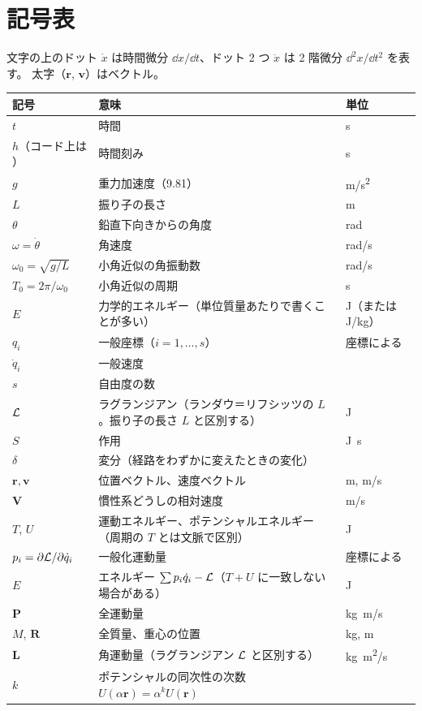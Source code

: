 \chapter{記号表}\label{ch:symbols}

文字の上のドット $\dot x$ は時間微分 $\dd x/\dd t$、ドット 2 つ $\ddot x$ は 2 階微分 $\dd^2x/\dd t^2$ を表す。
太字（$\bm r$, $\bm v$）はベクトル。

\begin{center}
\begin{tabularx}{\linewidth}{@{}lLl@{}}
\toprule
記号 & 意味 & 単位 \\
\midrule
$t$ & 時間 & \unit{s} \\
$h$（コード上は ） & 時間刻み & \unit{s} \\
$g$ & 重力加速度（9.81） & \unit{m/s^2} \\
$L$ & 振り子の長さ & \unit{m} \\
$\theta$ & 鉛直下向きからの角度 & \unit{rad} \\
$\omega=\dot\theta$ & 角速度 & \unit{rad/s} \\
$\omega_0=\sqrt{g/L}$ & 小角近似の角振動数 & \unit{rad/s} \\
$T_0=2\pi/\omega_0$ & 小角近似の周期 & \unit{s} \\
$E$ & 力学的エネルギー（単位質量あたりで書くことが多い） & \unit{J}（または \unit{J/kg}） \\
\midrule
$q_i$ & 一般座標（$i=1,\dots,s$） & 座標による \\
$\dot q_i$ & 一般速度 & \\
$s$ & 自由度の数 & \\
$\mathcal{L}$ & ラグランジアン（ランダウ＝リフシッツの $L$。振り子の長さ $L$ と区別する） & \unit{J} \\
$S$ & 作用 & \unit{J.s} \\
$\delta$ & 変分（経路をわずかに変えたときの変化） & \\
$\bm r,\bm v$ & 位置ベクトル、速度ベクトル & \unit{m}, \unit{m/s} \\
$\bm V$ & 慣性系どうしの相対速度 & \unit{m/s} \\
$T$, $U$ & 運動エネルギー、ポテンシャルエネルギー（周期の $T$ とは文脈で区別） & \unit{J} \\
\midrule
$p_i=\partial\mathcal{L}/\partial\dot q_i$ & 一般化運動量 & 座標による \\
$E$ & エネルギー $\sum p_i\dot q_i-\mathcal{L}$（$T+U$ に一致しない場合がある） & \unit{J} \\
$\bm P$ & 全運動量 & \unit{kg.m/s} \\
$M$, $\bm R$ & 全質量、重心の位置 & \unit{kg}, \unit{m} \\
$\bm L$ & 角運動量（ラグランジアン $\mathcal{L}$ と区別する） & \unit{kg.m^2/s} \\
$k$ & ポテンシャルの同次性の次数 $U(\alpha\bm r)=\alpha^kU(\bm r)$ & \\
\bottomrule
\end{tabularx}
\end{center}

